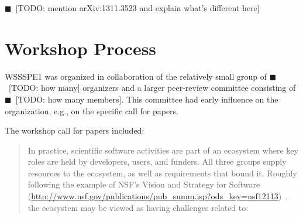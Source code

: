 \documentclass[11pt, oneside]{amsart}
\newcommand{\todo}[1]{{\color{blue}$\blacksquare$~\textsf{[TODO: #1]}}}
\begin{document}
\todo{mention arXiv:1311.3523 and explain what's different here}

\section{Workshop Process}

WSSSPE1 was organized in collaboration of the relatively small group of \todo{how many} organizers and
a larger peer-review committee consisting of \todo{how many members}. This committee had early influence on the organization,
e.g., on the specific call for papers.

The workshop call for papers included:

\begin{quote}
In practice, scientific software activities are part of an ecosystem where key roles are held by 
developers, users, and funders. All three groups supply resources to the ecosystem, as well as 
requirements that bound it. Roughly following the example of NSF's Vision and Strategy for Software 
(\url{http://www.nsf.gov/publications/pub_summ.jsp?ods_key=nsf12113})~\cite{NSF_software_vision}, 
the ecosystem may be viewed as having challenges related to:


\end{quote}
\end{document}
